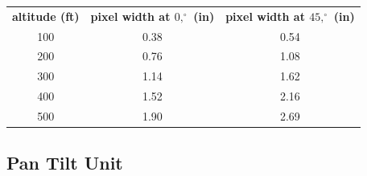 \documentclass[10pt]{report}
\begin{document}
\begin{tabular}{ccc}
\\{\bf altitude (ft)} & {\bf pixel width at $0,^{\circ}$ (in)} & {\bf pixel width at $45,^{\circ}$ (in)} \\
       100 &       0.38 &       0.54 \\
       200 &       0.76 &       1.08 \\
       300 &       1.14 &       1.62 \\
       400 &       1.52 &       2.16 \\
       500 &       1.90 &       2.69 \\
\end{tabular}


\subsection{Pan Tilt Unit}
\end{document}
